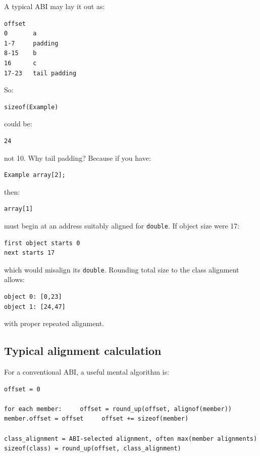 A typical ABI may lay it out as:

\begin{verbatim}
offset
0       a
1-7     padding
8-15    b
16      c
17-23   tail padding
\end{verbatim}

So:

\begin{verbatim}
sizeof(Example)
\end{verbatim}

could be:

\begin{verbatim}
24
\end{verbatim}

not 10. Why tail padding? Because if you have:

\begin{verbatim}
Example array[2];
\end{verbatim}

then:

\begin{verbatim}
array[1]
\end{verbatim}

must begin at an address suitably aligned for \texttt{double}. If object size were 17:

\begin{verbatim}
first object starts 0
next starts 17
\end{verbatim}

which would misalign its \texttt{double}. Rounding total size to the class alignment allows:

\begin{verbatim}
object 0: [0,23]
object 1: [24,47]
\end{verbatim}

with proper repeated alignment.

\subsection{Typical alignment calculation}\label{05-engine-i-ch003-typical-alignment-calculation}

For a conventional ABI, a useful mental algorithm is:

\begin{verbatim}
offset = 0

for each member:     offset = round_up(offset, alignof(member))     member.offset = offset     offset += sizeof(member)

class_alignment = ABI-selected alignment, often max(member alignments)
sizeof(class) = round_up(offset, class_alignment)
\end{verbatim}

